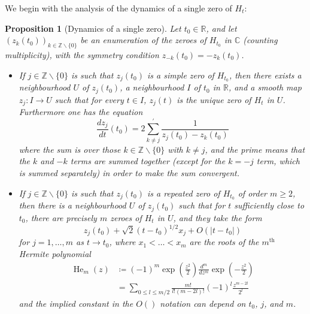 \documentclass[a4paper,11pt,twoside]{amsart}
\newtheorem{proposition}[theorem]{Proposition}
\newcommand\R{\mathbb{R}}
\newcommand\Z{\mathbb{Z}}
\newcommand\C{\mathbb{C}}
\begin{document}
We begin with the analysis of the dynamics of a single zero of $H_t$:

\begin{proposition}[Dynamics of a single zero]\label{dynam}  Let $t_0 \in \R$, and let $(z_k(t_0))_{k \in \Z \backslash \{0\}}$ be an enumeration of the zeroes of $H_{t_0}$ in $\C$ (counting multiplicity), with the symmetry condition $z_{-k}(t_0) = -z_k(t_0)$.
\begin{itemize}
\item[(i)]  If $j \in \Z \backslash \{0\}$ is such that $z_j(t_0)$ is a simple zero of $H_{t_0}$, then there exists a neighbourhood $U$ of $z_j(t_0)$, a neighbourhood $I$ of $t_0$ in $\R$, and a smooth map $z_j: I \to U$ such that for every $t \in I$, $z_j(t)$ is the unique zero of $H_t$ in $U$.  Furthermore one has the equation
\begin{equation}\label{zjk}
 \frac{d z_j}{d t}(t_0) = 2 \sum^{\prime}_{k \neq j} \frac{1}{z_j(t_0) - z_k(t_0)} 
\end{equation}
where the sum is over those $k \in \Z \backslash \{0\}$ with $k \neq j$, and the prime means that the $k$ and $-k$ terms are summed together (except for the $k=-j$ term, which is summed separately) in order to make the sum convergent.
\item[(ii)]  If $j \in \Z \backslash \{0\}$ is such that $z_j(t_0)$ is a repeated zero of $H_{t_0}$ of order $m \geq 2$, then there is a neighbourhood $U$ of $z_j(t_0)$ such that for $t$ sufficiently close to $t_0$, there are precisely $m$ zeroes of $H_t$ in $U$, and they take the form
$$ z_j(t_0) + \sqrt{2} (t-t_0)^{1/2} x_j + O( |t-t_0|)$$
for $j=1,\dots,m$ as $t \to t_0$, where $x_1 < \dots < x_m$ are the roots of the $m^{\operatorname{th}}$ Hermite polynomial
\begin{align}
\operatorname{He}_m(z) &\coloneqq (-1)^m \exp\left(\frac{z^2}{2}\right) \frac{d^m}{dz^m} \exp\left(-\frac{z^2}{2}\right)\label{heform}\\
&= \sum_{0 \leq l \leq m/2} \frac{m!}{l! (m-2l)!} (-1)^l \frac{z^{m-2l}}{2^l}\label{heform2}
\end{align}
and the implied constant in the $O()$ notation can depend on $t_0$, $j$, and $m$.
\end{itemize}
\end{proposition}
\end{document}
